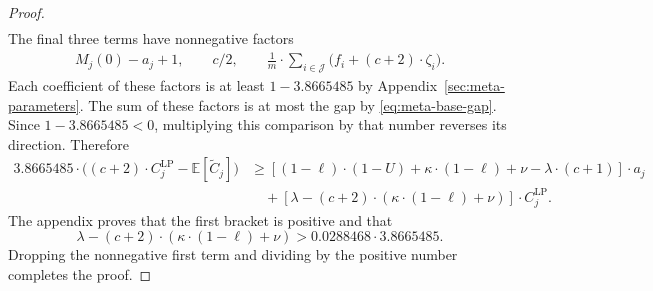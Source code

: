 \begin{proof}
\begin{align*}
\end{align*}
The final three terms have nonnegative factors
\[
\begin{gathered}
 M_j(0)-a_j+1,\qquad c/2,\qquad
 \frac1m\cdot\sum_{i\in\mathcal J}\bigl(f_i+(c+2)\cdot\zeta_i\bigr).
\end{gathered}
\]
Each coefficient of these factors is at least
$1-3.8665485$ by Appendix~\ref{sec:meta-parameters}.
The sum of these factors is at most the gap by
\eqref{eq:meta-base-gap}. Since $1-3.8665485<0$, multiplying this
comparison by that number reverses its direction. Therefore
\begin{align*}
 3.8665485\cdot
 \bigl((c+2)\cdot C_j^{\mathrm{LP}}-\mathbb E[\widetilde C_j]\bigr)
 &\ge [(1-\ell)\cdot(1-U)+\kappa\cdot(1-\ell)+\nu-\lambda\cdot(c+1)]\cdot a_j\\
 &\quad +[\lambda-(c+2)\cdot(\kappa\cdot(1-\ell)+\nu)]\cdot C_j^{\mathrm{LP}}.
\end{align*}
The appendix proves that the first bracket is positive and that
\[
 \lambda-(c+2)\cdot(\kappa\cdot(1-\ell)+\nu)
 >0.0288468\cdot3.8665485.
\]
Dropping the nonnegative first term and dividing by the positive
number completes the proof.
\end{proof}


